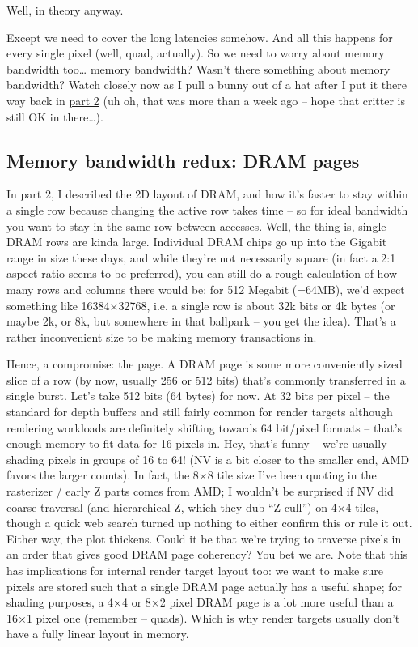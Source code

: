 \documentclass[12pt]{article}
\begin{document}
Well, in theory anyway.

Except we need to cover the long latencies somehow. And all this happens for every single pixel (well, quad, actually). So we need to worry about memory bandwidth too… memory bandwidth? Wasn’t there something about memory bandwidth? Watch closely now as I pull a bunny out of a hat after I put it there way back in \hyperref[part2]{part 2} (uh oh, that was more than a week ago – hope that critter is still OK in there…).

\subsection{Memory bandwidth redux: DRAM pages}
\label{sec:org111a3e9}

In part 2, I described the 2D layout of DRAM, and how it’s faster to stay within a single row because changing the active row takes time – so for ideal bandwidth you want to stay in the same row between accesses. Well, the thing is, single DRAM rows are kinda large. Individual DRAM chips go up into the Gigabit range in size these days, and while they’re not necessarily square (in fact a 2:1 aspect ratio seems to be preferred), you can still do a rough calculation of how many rows and columns there would be; for 512 Megabit (=64MB), we’d expect something like 16384×32768, i.e. a single row is about 32k bits or 4k bytes (or maybe 2k, or 8k, but somewhere in that ballpark – you get the idea). That’s a rather inconvenient size to be making memory transactions in.

Hence, a compromise: the page. A DRAM page is some more conveniently sized slice of a row (by now, usually 256 or 512 bits) that’s commonly transferred in a single burst. Let’s take 512 bits (64 bytes) for now. At 32 bits per pixel – the standard for depth buffers and still fairly common for render targets although rendering workloads are definitely shifting towards 64 bit/pixel formats – that’s enough memory to fit data for 16 pixels in. Hey, that’s funny – we’re usually shading pixels in groups of 16 to 64! (NV is a bit closer to the smaller end, AMD favors the larger counts). In fact, the 8×8 tile size I’ve been quoting in the rasterizer / early Z parts comes from AMD; I wouldn’t be surprised if NV did coarse traversal (and hierarchical Z, which they dub “Z-cull”) on 4×4 tiles, though a quick web search turned up nothing to either confirm this or rule it out. Either way, the plot thickens. Could it be that we’re trying to traverse pixels in an order that gives good DRAM page coherency? You bet we are. Note that this has implications for internal render target layout too: we want to make sure pixels are stored such that a single DRAM page actually has a useful shape; for shading purposes, a 4×4 or 8×2 pixel DRAM page is a lot more useful than a 16×1 pixel one (remember – quads). Which is why render targets usually don’t have a fully linear layout in memory.
\end{document}
